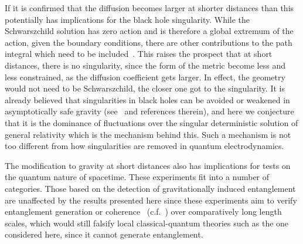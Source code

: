 \documentclass[aps,preprintnumbers,superscriptaddress,longbibliography]{revtex4-1}
\def\R2Term{\Delta_{\text{\tiny 2}}}
\begin{document}
If it is confirmed that the diffusion becomes larger at shorter distances than this potentially has implications for the black hole singularity.
While the Schwarszchild solution has zero action and is therefore a global extremum of the action, given the boundary conditions, there are other contributions to the path integral which need to be included~\cite{UCLDMDNE}. This raises the prospect that at short distances, there is no singularity, since the form of the metric become less and less constrained, as the diffusion coefficient gets larger. In effect, the geometry would not need to be Schwarszchild, the closer one got to the singularity. 
It is already believed that singularities in black holes can be avoided or weakened in asymptotically safe gravity (see~\cite{platania2023black} and references therein), and here we conjecture that it is the dominance of fluctuations over the singular deterministic solution of general relativity which is the mechanism behind this. Such a mechanism is not too different from how singularities are removed in quantum electrodynamics.


The modification to gravity at short distances also has implications for tests on the quantum nature of spacetime. These experiments fit into a number of categories. Those based on the detection of gravitationally induced entanglement~\cite{bose2017spin,marletto2017gravitationally} are unaffected by the results presented here since these experiments aim to verify entanglement generation or coherence~\cite{lami2023testing} (c.f.~\cite{kryhin2023distinguishable}) over comparatively long length scales, which would still falsify local classical-quantum theories such as the one considered here, since it cannot generate entanglement. 
\end{document}
